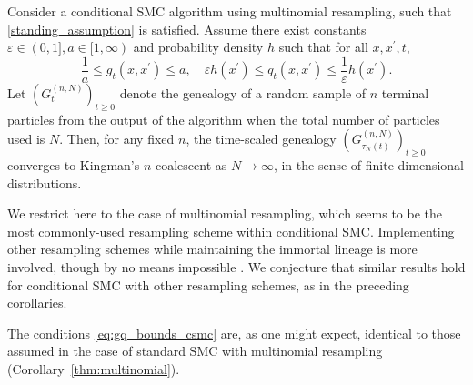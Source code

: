 \begin{corollary}\label{thm:CSMC}
Consider a conditional SMC algorithm using multinomial resampling, such that \ref{standing_assumption} is satisfied. Assume there exist constants $\varepsilon\in (0,1], a\in [1,\infty)$ and probability density $h$ such that for all $x, x^\prime, t$,
\begin{equation}\label{eq:gq_bounds_csmc}
\frac{1}{a} \leq g_t(x, x^\prime) \leq a , \quad
\varepsilon h(x^\prime) \leq q_t(x, x^\prime) \leq \frac{1}{\varepsilon} h(x^\prime) .
\end{equation}
Let $(G_t^{(n,N)})_{t\geq0}$ denote the genealogy of a random sample of $n$ terminal particles from the output of the algorithm when the total number of particles used is $N$. Then, for any fixed $n$, the time-scaled genealogy $(G_{\tau_N(t)}^{(n,N)})_{t\geq0}$ converges to Kingman's $n$-coalescent as $N\to \infty$, in the sense of finite-dimensional distributions.
\end{corollary}
We restrict here to the case of multinomial resampling, which seems to be the most commonly-used resampling scheme within conditional SMC. Implementing other resampling schemes while maintaining the immortal lineage is more involved, though by no means impossible \parencite{lee2019}.
We conjecture that similar results hold for conditional SMC with other resampling schemes, as in the preceding corollaries.

The conditions \eqref{eq:gq_bounds_csmc} are, as one might expect, identical to those assumed in the case of standard SMC with multinomial resampling (Corollary~\ref{thm:multinomial}).

